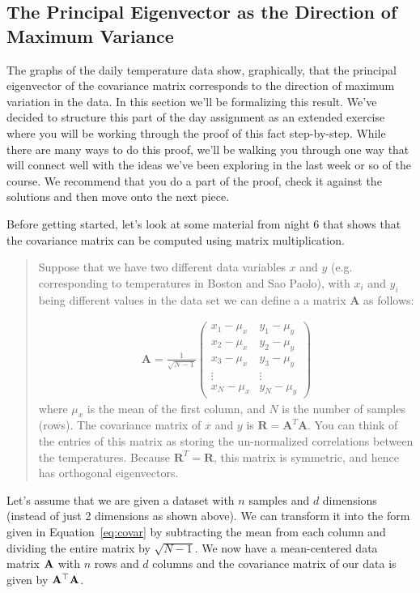 \subsection{The Principal Eigenvector as the Direction of Maximum Variance}

The graphs of the daily temperature data show, graphically, that the principal eigenvector of the covariance matrix corresponds to the direction of maximum variation in the data.  In this section we'll be formalizing this result.  We've decided to structure this part of the day assignment as an extended exercise where you will be working through the proof of this fact step-by-step.  While there are many ways to do this proof, we'll be walking you through one way that will connect well with the ideas we've been exploring in the last week or so of the course.  We recommend that you do a part of the proof, check it against the solutions and then move onto the next piece.

Before getting started, let's look at some material from night 6 that shows that the covariance matrix can be computed using matrix multiplication.

\begin{quote}
Suppose that  we have two different data variables $x$ and $y$ (e.g. corresponding to temperatures in Boston and Sao Paolo), with $x_i$ and $y_i$ being different values in the data set we can define a a matrix $\mathbf{A}$ as follows:

\begin{align}
\mathbf{A} = \frac{1}{\sqrt{N-1}} \begin{pmatrix}
    {x_1-\mu_x} & {y_1-\mu_y}\\
   {x_2-\mu_x} &  {y_2-\mu_y}\\
    {x_3-\mu_x} & {y_3-\mu_y}\\
    \vdots & \vdots \\
    x_N - \mu_x & y_N - \mu_y
  \end{pmatrix} \label{eq:covar}
\end{align}
where $\mu_x$ is the mean  of the first column, and $N$ is the number of samples (rows).  The covariance matrix of $x$ and $y$ is $\mathbf{R} = \mathbf{A}^T \mathbf{A}$. You can think of the entries of this matrix as storing the un-normalized correlations between the temperatures. Because $\mathbf{R}^T = \mathbf{R}$, this matrix is symmetric, and hence has orthogonal eigenvectors.
\end{quote}

Let's assume that we are given a dataset with $n$ samples and $d$ dimensions (instead of just 2 dimensions as shown above).  We can transform it into the form given in Equation~\ref{eq:covar} by subtracting the mean from each column and dividing the entire matrix by $\sqrt{N-1}$.  We now have a mean-centered data matrix $\mathbf{A}$ with $n$ rows and $d$ columns and the covariance matrix of our data is given by $\mathbf{A}^\top \mathbf{A}$.



